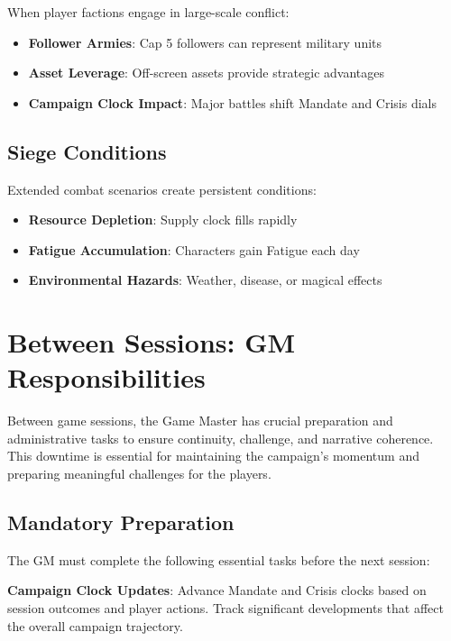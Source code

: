 When player factions engage in large-scale conflict:

\begin{itemize}
    \item \textbf{Follower Armies}: Cap 5 followers can represent military units
    \item \textbf{Asset Leverage}: Off-screen assets provide strategic advantages
    \item \textbf{Campaign Clock Impact}: Major battles shift Mandate and Crisis dials
\end{itemize}

\subsection*{Siege Conditions}

Extended combat scenarios create persistent conditions:

\begin{itemize}
    \item \textbf{Resource Depletion}: Supply clock fills rapidly
    \item \textbf{Fatigue Accumulation}: Characters gain Fatigue each day
    \item \textbf{Environmental Hazards}: Weather, disease, or magical effects
\end{itemize}

\section*{Between Sessions: GM Responsibilities}

Between game sessions, the Game Master has crucial preparation and administrative tasks to ensure continuity, challenge, and narrative coherence. This downtime is essential for maintaining the campaign's momentum and preparing meaningful challenges for the players.

\subsection*{Mandatory Preparation}

The GM must complete the following essential tasks before the next session:

\textbf{Campaign Clock Updates}: Advance Mandate and Crisis clocks based on session outcomes and player actions. Track significant developments that affect the overall campaign trajectory.

